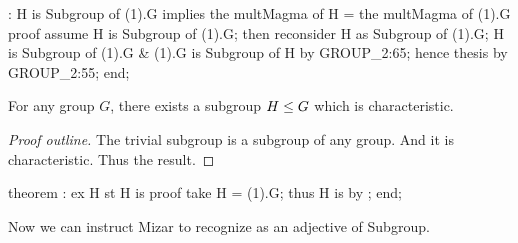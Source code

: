 \nwenddocs{}\endmoddef\nwstartdeflinemarkup{}\nwenddeflinemarkup
{}: H is Subgroup of (1).G implies the multMagma of H = the multMagma of (1).G
proof
  assume H is Subgroup of (1).G;
  then reconsider H as Subgroup of (1).G;
  H is Subgroup of (1).G & (1).G is Subgroup of H by GROUP_2:65;
  hence thesis by GROUP_2:55;
end;
\eatline
{}\nwendcode{}\nwdocspar
\begin{theorem}
For any group $G$, there exists a subgroup $H\leq G$ which is characteristic.
\end{theorem}
\begin{proof}[Proof outline]
The trivial subgroup is a subgroup of any group. And it is
characteristic. Thus the result.
\end{proof}

\nwenddocs{}\endmoddef\nwstartdeflinemarkup{}\nwenddeflinemarkup

theorem :
  ex H st H is 
proof
  take H = (1).G;
  thus H is  by ;
end;
\eatline
{}\nwendcode{}\nwdocspar
\begin{registration}
Now we can instruct Mizar to recognize {\Tt{}\nwendquote} as an
adjective of {\Tt{}Subgroup\nwendquote}.
\end{registration}

